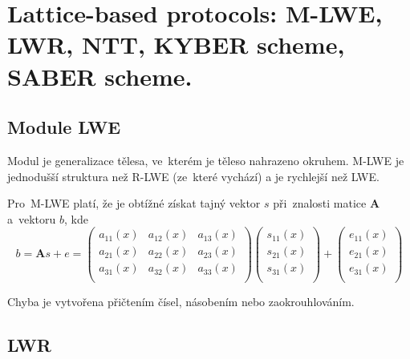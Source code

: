 \clearpage
\section{Lattice-based protocols: M-LWE, LWR, NTT, KYBER scheme, SABER scheme.}

\subsection{Module LWE}

Modul je generalizace tělesa, ve~kterém je těleso\footnotemark{} nahrazeno okruhem\footnotemark{}.
M-LWE je jednodušší struktura než R-LWE (ze~které vychází) a je rychlejší než LWE.

Pro~M-LWE platí, že je obtížné získat tajný vektor $s$ při~znalosti matice \textbf{A} a~vektoru $b$, kde
$$
b =
\textbf{A}s + e =
\left(\begin{matrix}
a_{11}(x) & a_{12}(x) & a_{13}(x) \\
a_{21}(x) & a_{22}(x) & a_{23}(x) \\
a_{31}(x) & a_{32}(x) & a_{33}(x) \\
\end{matrix}\right) \left(\begin{matrix}
s_{11}(x) \\ s_{21}(x) \\ s_{31}(x) \\
\end{matrix}\right) + \left(\begin{matrix}
e_{11}(x) \\ e_{21}(x) \\ e_{31}(x) \\
\end{matrix}\right)
$$

Chyba je vytvořena přičtením čísel, násobením nebo zaokrouhlováním.


\subsection{LWR}

